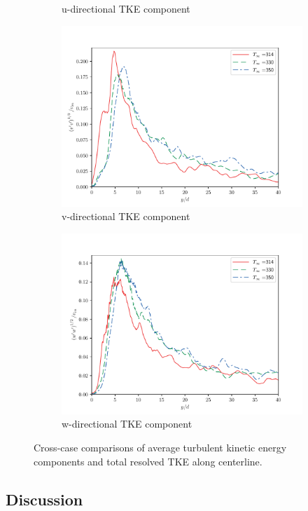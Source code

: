\begin{figure}[H]
\begin{center}
\begin{subfigure}{0.45\textwidth}
	\caption{u-directional TKE component} \label{u_fa_1}
\end{subfigure}
\vfill
\begin{subfigure}{0.45\textwidth}
	\includegraphics[scale=.45]{figures/Plots/centerline/v_fa_centerline.pdf}
	\caption{v-directional TKE component} \label{v_fa_1}
\end{subfigure}
\begin{subfigure}{0.45\textwidth}
	\includegraphics[scale=.45]{figures/Plots/centerline/w_fa_centerline.pdf}
	\caption{w-directional TKE component} \label{w_fa_1}
\end{subfigure}
\caption{Cross-case comparisons of average turbulent kinetic energy components and total resolved TKE along centerline.}
\label{noniso_TKE_features}
\end{center}
\end{figure}



\subsection{Discussion}





